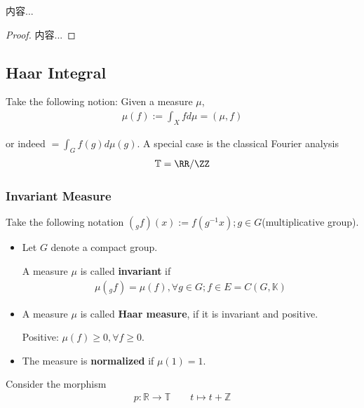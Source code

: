 \documentclass[Total.tex]{subfiles}
\begin{document}
			\begin{corollary}
				内容...
			\end{corollary}
			\begin{proof}
				内容...
			\end{proof}
			\subsection{Haar Integral}
			
			Take the following notion: Given a measure $\mu$,
			\begin{gather*}
				\mu(f):=\int_X fd\mu=(\mu,f)
			\end{gather*}
			
			or indeed $=\int_G f(g)d\mu(g)$. A special case is the classical Fourier analysis
			\begin{gather*}
				\mathbb{T}=\RR/\ZZ
			\end{gather*}
			
			\subsubsection{Invariant Measure}
			
			Take the following notation $(_gf)(x):=f(g^{-1}x);g\in G$(multiplicative group).
			
			\begin{Def}
				\begin{itemize}
					\item Let $G$ denote a compact group.
					
					A measure $\mu$ is called \textbf{invariant} if
					\begin{gather*}
						\mu(_g f)=\mu(f),\forall g\in G;f\in E=C(G,\mathbb{K})
					\end{gather*}
					\item A measure $\mu$ is called \textbf{Haar measure}, if it is invariant and positive.
					
					Positive: $\mu(f)\geq 0,\forall f\geq 0$.
					\item The measure is \textbf{normalized} if $\mu(1)=1$.
				\end{itemize}
			\end{Def}
			
			\begin{example}
				Consider the morphism
				\begin{gather*}
					p:\mathbb{R}\rightarrow \mathbb{T}\qquad t\mapsto t+\mathbb{Z}
				\end{gather*}
			\end{example}
			
\end{document}
